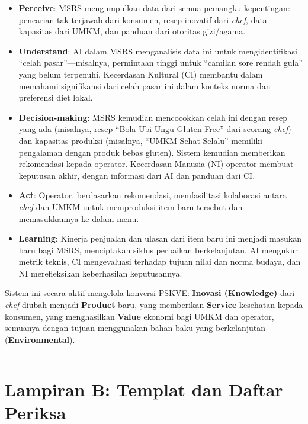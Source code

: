 \documentclass[
  letterpaper,
  DIV=11,
  numbers=noendperiod]{scrreprt}
\providecommand{\tightlist}{%
  \setlength{\itemsep}{0pt}\setlength{\parskip}{0pt}}
\begin{document}
\begin{itemize}
  \begin{itemize}
  \tightlist
  \item
    \textbf{Perceive}: MSRS mengumpulkan data dari semua pemangku
    kepentingan: pencarian tak terjawab dari konsumen, resep inovatif
    dari \emph{chef}, data kapasitas dari UMKM, dan panduan dari
    otoritas gizi/agama.
  \item
    \textbf{Understand}: AI dalam MSRS menganalisis data ini untuk
    mengidentifikasi ``celah pasar''---misalnya, permintaan tinggi untuk
    ``camilan sore rendah gula'' yang belum terpenuhi. Kecerdasan
    Kultural (CI) membantu dalam memahami signifikansi dari celah pasar
    ini dalam konteks norma dan preferensi diet lokal.
  \item
    \textbf{Decision-making}: MSRS kemudian mencocokkan celah ini dengan
    resep yang ada (misalnya, resep ``Bola Ubi Ungu Gluten-Free'' dari
    seorang \emph{chef}) dan kapasitas produksi (misalnya, ``UMKM Sehat
    Selalu'' memiliki pengalaman dengan produk bebas gluten). Sistem
    kemudian memberikan rekomendasi kepada operator. Kecerdasan Manusia
    (NI) operator membuat keputusan akhir, dengan informasi dari AI dan
    panduan dari CI.
  \item
    \textbf{Act}: Operator, berdasarkan rekomendasi, memfasilitasi
    kolaborasi antara \emph{chef} dan UMKM untuk memproduksi item baru
    tersebut dan memasukkannya ke dalam menu.
  \item
    \textbf{Learning}: Kinerja penjualan dan ulasan dari item baru ini
    menjadi masukan baru bagi MSRS, menciptakan siklus perbaikan
    berkelanjutan. AI mengukur metrik teknis, CI mengevaluasi terhadap
    tujuan nilai dan norma budaya, dan NI merefleksikan keberhasilan
    keputusannya.
  \end{itemize}
\end{itemize}

Sistem ini secara aktif mengelola konversi PSKVE: \textbf{Inovasi
(Knowledge)} dari \emph{chef} diubah menjadi \textbf{Product} baru, yang
memberikan \textbf{Service} kesehatan kepada konsumen, yang menghasilkan
\textbf{Value} ekonomi bagi UMKM dan operator, semuanya dengan tujuan
menggunakan bahan baku yang berkelanjutan (\textbf{Environmental}).

\begin{center}\rule{0.5\linewidth}{0.5pt}\end{center}


\chapter{\texorpdfstring{\textbf{Lampiran B: Templat dan Daftar
Periksa}}{Lampiran B: Templat dan Daftar Periksa}}\label{lampiran-b-templat-dan-daftar-periksa}
\end{document}

